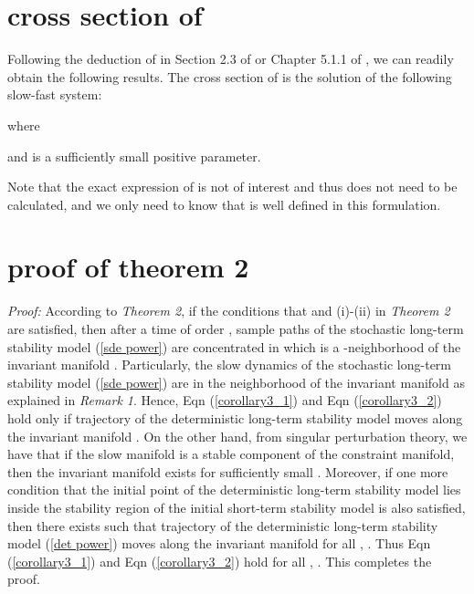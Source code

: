 \documentclass[journal]{IEEEtran}
\begin{document}
\section{cross section of }\label{appendix2}
Following the deduction of  in Section 2.3 of \cite{Gentz:2003} or Chapter 5.1.1 of \cite{Gentz:2006}, we can readily obtain the following results. The cross section  of  is the solution of the following slow-fast system:

where

and  is a sufficiently small positive parameter.


Note that the exact expression of  is not of interest and thus does not need to be calculated, and we only need to know that  is well defined in this formulation.



\section{proof of theorem 2}\label{appendix3}
\textit{Proof:} According to \textit{Theorem 2}, if the conditions that  and (i)-(ii) in \textit{Theorem 2} are satisfied, then after a time of order , sample paths of the stochastic long-term stability model (\ref{sde power}) are concentrated in  which is a -neighborhood of the invariant manifold . Particularly, the slow dynamics of the stochastic long-term stability model (\ref{sde power}) are in the  neighborhood of the invariant manifold  as explained in \textit{Remark 1}.
Hence, Eqn (\ref{corollary3_1}) and Eqn (\ref{corollary3_2}) hold only if trajectory of the deterministic long-term stability model moves along the invariant manifold . On the other hand, from singular perturbation theory, we have that if the slow manifold  is a stable component of the constraint manifold, then the invariant manifold  exists for sufficiently small . Moreover, if one more condition that the initial point of the deterministic long-term stability model lies inside the stability region of the initial short-term stability model is also satisfied,  then there exists  such that trajectory of the deterministic long-term stability model (\ref{det power}) moves along the invariant manifold  for all ,  \cite{Khalil:book}\cite{Wangxz:CAS}. Thus Eqn (\ref{corollary3_1}) and Eqn (\ref{corollary3_2}) hold for all , . This completes the proof.



\ifCLASSOPTIONcaptionsoff
  \newpage
\fi
\end{document}
